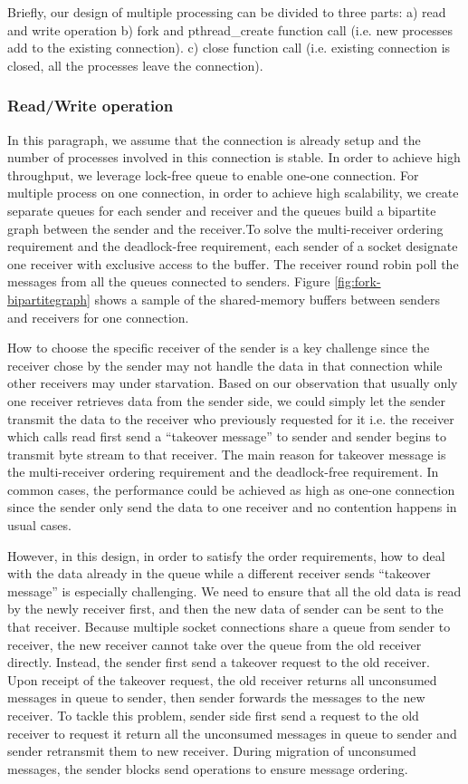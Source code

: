 Briefly, our design of multiple processing can be divided to three parts: a) read and write operation b) fork and pthread\_create function call (i.e. new processes add to the existing connection). c) close function call (i.e. existing connection is closed, all the processes leave the connection).


\subsubsection{Read/Write operation}
\label{subsubsec:fork_rdwr}

In this paragraph, we assume that the connection is already setup and the number of processes involved in this connection is stable. In order to achieve high throughput, we leverage lock-free queue to enable one-one connection. For multiple process on one connection, in order to achieve high scalability, we create separate queues for each sender and receiver and the queues build a bipartite graph between the sender and the receiver.To solve the multi-receiver ordering requirement and the deadlock-free requirement, each sender of a socket designate one receiver with exclusive access to the buffer. The receiver round robin poll the messages from all the queues connected to senders. Figure \ref{fig:fork-bipartitegraph} shows a sample of the shared-memory buffers between senders and receivers for one connection. 

How to choose the specific receiver of the sender is a key challenge since the receiver chose by the sender may not handle the data in that connection while other receivers may under starvation. Based on our observation that usually only one receiver retrieves data from the sender side, we could simply let the sender transmit the data to the receiver who previously requested for it i.e. the receiver which calls read first send a ``takeover message'' to sender and sender begins to transmit byte stream to that receiver.  The main reason for takeover message is the multi-receiver ordering requirement and the deadlock-free requirement. In common cases, the performance could be achieved as high as one-one connection since the sender only send the data to one receiver and no contention happens in usual cases.

However, in this design, in order to satisfy the order requirements, how to deal with the data already in the queue while a different receiver sends ``takeover message'' is especially challenging.  We need to ensure that all the old data is read by the newly receiver first, and then the new data of sender can be sent to the that receiver. Because multiple socket connections share a queue from sender to receiver, the new receiver cannot take over the queue from the old receiver directly. Instead, the sender first send a takeover request to the old receiver. Upon receipt of the takeover request, the old receiver returns all unconsumed messages in queue to sender, then sender forwards the messages to the new receiver. To tackle this problem, sender side first send a request to the old receiver to request it return all the unconsumed messages in queue to sender and sender retransmit them to new receiver. During migration of unconsumed messages, the sender blocks send operations to ensure message ordering.

